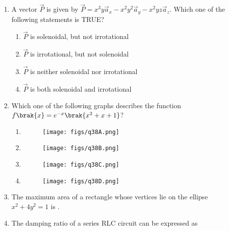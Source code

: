 \documentclass[a4paper, 11pt]{article}
\begin{document}
\begin{enumerate}
    \hfill{}

    \item A vector $\vec{P}$ is given by $\vec{P}=x^{3}y\vec{a}_{x}-x^{2}y^{2}\vec{a}_{y}-x^{2}yz\vec{a}_{z}$. Which one of the following statements is TRUE?
    \begin{enumerate}
        \item $\vec{P}$ is solenoidal, but not irrotational
        \item $\vec{P}$ is irrotational, but not solenoidal
        \item $\vec{P}$ is neither solenoidal nor irrotational
        \item $\vec{P}$ is both solenoidal and irrotational
    \end{enumerate}
    
    \hfill{}

    \item Which one of the following graphs describes the function $f\brak{x}=e^{-x}\brak{x^{2}+x+1}$?
    \begin{enumerate}
        \item \begin{figure}[H]\centering\texttt{[image: figs/q38A.png]}\end{figure}
        \item \begin{figure}[H]\centering\texttt{[image: figs/q38B.png]}\end{figure}
        \item \begin{figure}[H]\centering\texttt{[image: figs/q38C.png]}\end{figure}
        \item \begin{figure}[H]\centering\texttt{[image: figs/q38D.png]}\end{figure}
    \end{enumerate}
    
    \hfill{}

    \item The maximum area  of a rectangle whose vertices lie on the ellipse $x^{2}+4y^{2}=1$ is \underline{\hspace{2cm}}.
    
    \hfill{}

    \item The damping ratio of a series RLC circuit can be expressed as
    \begin{enumerate}
    \end{enumerate}
    

\end{enumerate}
\end{document}
